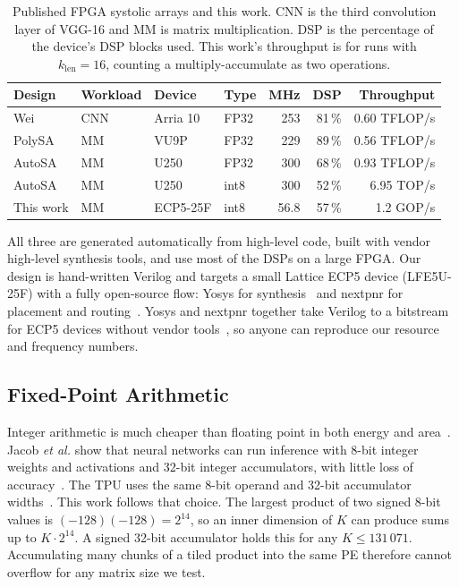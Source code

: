 \begin{table}[t]
\centering
\caption{Published FPGA systolic arrays and this work. CNN is the third convolution layer of VGG-16 and MM is matrix multiplication. DSP is the percentage of the device's DSP blocks used. This work's throughput is for runs with $k_{\mathrm{len}} = 16$, counting a multiply-accumulate as two operations.}
\label{tab:fpgacompare}
\footnotesize
\setlength{\tabcolsep}{3pt}
\begin{tabular}{@{}llllrrr@{}}
\toprule
Design & Workload & Device & Type & MHz & DSP & Throughput \\
\midrule
Wei~\cite{wei2017automated} & CNN & Arria 10 & FP32 & 253 & 81\,\% & 0.60 TFLOP/s \\
PolySA~\cite{cong2018polysa} & MM & VU9P & FP32 & 229 & 89\,\% & 0.56 TFLOP/s \\
AutoSA~\cite{wang2021autosa} & MM & U250 & FP32 & 300 & 68\,\% & 0.93 TFLOP/s \\
AutoSA~\cite{wang2021autosa} & MM & U250 & int8 & 300 & 52\,\% & 6.95 TOP/s \\
\midrule
This work & MM & ECP5-25F & int8 & 56.8 & 57\,\% & 1.2 GOP/s \\
\bottomrule
\end{tabular}
\end{table}

All three are generated automatically from high-level code, built with vendor high-level synthesis tools, and use most of the DSPs on a large FPGA. Our design is hand-written Verilog and targets a small Lattice ECP5 device (LFE5U-25F) with a fully open-source flow: Yosys for synthesis~\cite{wolf2013yosys} and nextpnr for placement and routing~\cite{shah2019yosysnextpnr}. Yosys and nextpnr together take Verilog to a bitstream for ECP5 devices without vendor tools~\cite{shah2019yosysnextpnr}, so anyone can reproduce our resource and frequency numbers.

\subsection{Fixed-Point Arithmetic}
Integer arithmetic is much cheaper than floating point in both energy and area~\cite{horowitz2014energy}. Jacob \emph{et al.} show that neural networks can run inference with 8-bit integer weights and activations and 32-bit integer accumulators, with little loss of accuracy~\cite{jacob2018quantization}. The TPU uses the same 8-bit operand and 32-bit accumulator widths~\cite{jouppi2017tpu}. This work follows that choice. The largest product of two signed 8-bit values is $(-128)(-128) = 2^{14}$, so an inner dimension of $K$ can produce sums up to $K \cdot 2^{14}$. A signed 32-bit accumulator holds this for any $K \le 131\,071$. Accumulating many chunks of a tiled product into the same PE therefore cannot overflow for any matrix size we test.


